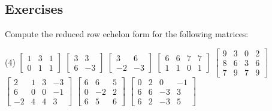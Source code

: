 \subsection{Exercises}

\begin{samepage}
\begin{exercise}
Compute the reduced row echelon form for the following matrices:
\begin{tasks}(4)
\task
$\begin{bmatrix}
1 & 3 & 1 \\
0 & 1 & 1
\end{bmatrix}$
\task
$\begin{bmatrix}
3 & 3 \\
6 & -3
\end{bmatrix}$
\task
$\begin{bmatrix}
3 & 6 \\
-2 & -3
\end{bmatrix}$
\task
$\begin{bmatrix}
6 & 6 & 7 & 7 \\
1 & 1 & 0 & 1
\end{bmatrix}$
\task
$\begin{bmatrix}
9 & 3 & 0 & 2 \\
8 & 6 & 3 & 6 \\
7 & 9 & 7 & 9
\end{bmatrix}$
\task
$\begin{bmatrix}
2 & 1 & 3 & -3 \\
6 & 0 & 0 & -1 \\
-2 & 4 & 4 & 3
\end{bmatrix}$
\task
$\begin{bmatrix}
6 & 6 & 5 \\
0 & -2 & 2 \\
6 & 5 & 6
\end{bmatrix}$
\task
$\begin{bmatrix}
0 & 2 & 0 & -1 \\
6 & 6 & -3 & 3 \\
6 & 2 & -3 & 5
\end{bmatrix}$
\end{tasks}
\end{exercise}
\end{samepage}

